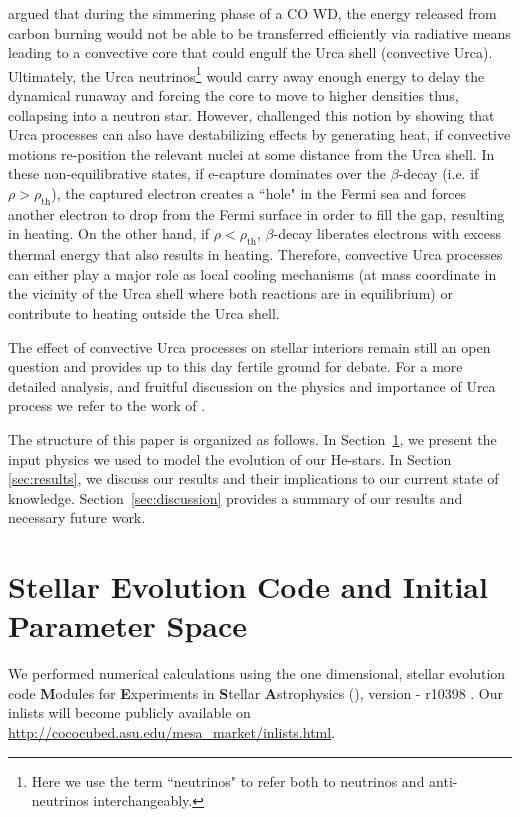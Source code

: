 \documentclass[../../main/thesis_msc.tex]{subfiles}
\begin{document}
\cite{Paczy1972} argued that during the simmering phase of a CO WD, the energy released from carbon burning would not be able to be transferred efficiently via radiative means leading to a convective core that could engulf the Urca shell (convective Urca). Ultimately, the Urca neutrinos\footnote{Here we use the term ``neutrinos" to refer both to neutrinos and anti-neutrinos interchangeably.} would carry away enough energy to delay the dynamical runaway and forcing the core to move to higher densities thus, collapsing into a neutron star. However, \cite{Bruenn1973} challenged this notion by showing that Urca processes can also have destabilizing effects by generating heat, if convective motions re-position the relevant nuclei at some distance from the Urca shell. In these non-equilibrative states, if e-capture dominates over the $\beta$-decay (i.e. if $\rho > \rho_{\text{th}}$), the captured electron creates a ``hole" in the Fermi sea and forces another electron to drop from the Fermi surface in order to fill the gap, resulting in heating. On the other hand, if $\rho < \rho_{\text{th}}$, $\beta$-decay liberates electrons with excess thermal energy that also results in heating. Therefore, convective Urca processes can either play a major role as local cooling mechanisms (at mass coordinate in the vicinity of the Urca shell where both reactions are in equilibrium) or contribute to heating outside the Urca shell.

The effect of convective Urca processes on stellar interiors remain still an open question and provides up to this day fertile ground for debate. For a more detailed analysis, and fruitful discussion on the physics and importance of Urca process we refer to the work of \cite{Paczy1973, Barkat1990, Ritossa1999, Stein1999, Lesaffre2005, Waldman2007, Denisseknkov2015, Schwab2017}.

The structure of this paper is organized as follows. In Section\, \ref{sec:methods}, we present the input physics we used to model the evolution of our He-stars. In Section\, \ref{sec:results}, we discuss our results and their implications to our current state of knowledge. Section\, \ref{sec:discussion} provides a summary of our results and necessary future work.



\section{Stellar Evolution Code and Initial Parameter Space} \label{sec:methods}
We performed numerical calculations using the one dimensional, stellar evolution code \textbf{M}odules for \textbf{E}xperiments in \textbf{S}tellar \textbf{A}strophysics (\mesa), version - r10398 \citep{Paxton2011, Paxton2013, Paxton2015, Paxton2018, Paxton2019}. Our \mesa inlists will become publicly available on \url{http://cococubed.asu.edu/mesa_market/inlists.html}.
\end{document}
